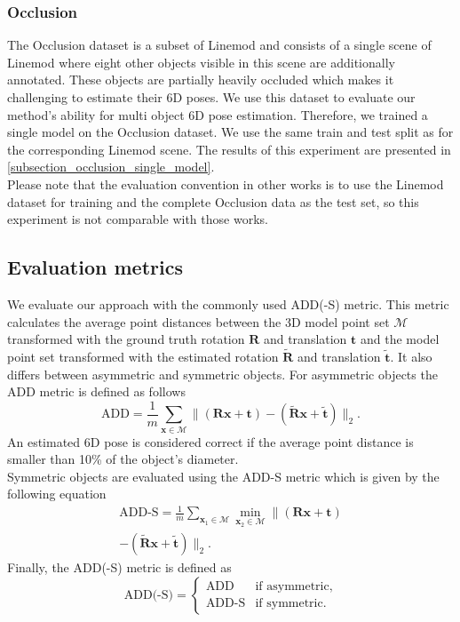 \documentclass[twocolumn, 10pt, letterpaper]{article}
\begin{document}
\subsubsection{Occlusion}
\label{subsubsection_occlusion}
The Occlusion dataset is a subset of Linemod and consists of a single scene of Linemod where eight other objects visible in this scene are additionally annotated. These objects are partially heavily occluded which makes it challenging to estimate their 6D poses. We use this dataset to evaluate our method's ability for multi object 6D pose estimation. Therefore, we trained a single model on the Occlusion dataset. We use the same train and test split as for the corresponding Linemod scene. The results of this experiment are presented in \autoref{subsection_occlusion_single_model}.\\
Please note that the evaluation convention in other works \cite{PoseCNN}\cite{PVNet} is to use the Linemod dataset for training and the complete Occlusion data as the test set, so this experiment is not comparable with those works.

\subsection{Evaluation metrics}
\label{subsection_evaluation_metrics}
We evaluate our approach with the commonly used ADD(-S) metric\cite{ADD}. This metric calculates the average point distances between the 3D model point set $\mathcal{M}$ transformed with the ground truth rotation $\mathbf{R}$ and translation $\mathbf{t}$ and the model point set transformed with the estimated rotation $\mathbf{\tilde{R}}$ and translation $\mathbf{\tilde{t}}$. It also differs between asymmetric and symmetric objects. For asymmetric objects the ADD metric is defined as follows
\begin{equation}
\label{equation_add_metric}
\text{ADD} = \frac{1}{m}\sum_{\mathbf{x} \in \mathcal{M}}\| (\mathbf{Rx} + \mathbf{t}) - (\mathbf{\tilde{R}x} + \mathbf{\tilde{t}})  \|_2.
\end{equation}
An estimated 6D pose is considered correct if the average point distance is smaller than 10\% of the object's diameter.\\
Symmetric objects are evaluated using the ADD-S metric which is given by the following equation
\begin{equation}
\label{equation_add_s_metric}
\begin{split}
\text{ADD-S} = \frac{1}{m}\sum_{\mathbf{x}_1 \in \mathcal{M}} \min_{\mathbf{x}_2 \in \mathcal{M}} \| (\mathbf{Rx} + \mathbf{t})\\
 - (\mathbf{\tilde{R}x} + \mathbf{\tilde{t}})  \|_2.
\end{split}
\end{equation}
Finally, the ADD(-S) metric is defined as 
\begin{equation}
\label{equation_complete_add_s_metric}
\text{ADD(-S)} = 
\begin{cases}
\text{ADD} & \text{if asymmetric}, \\
\text{ADD-S} & \text{if symmetric}.
\end{cases}
\end{equation}
\end{document}
